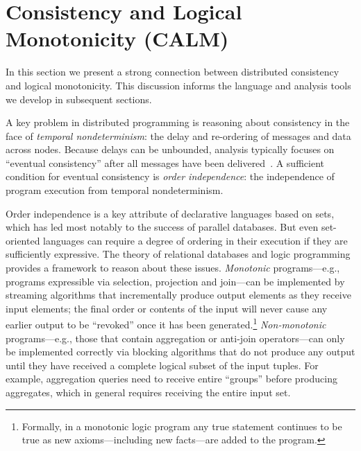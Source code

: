 \section{Consistency and Logical Monotonicity (CALM)}
In this section we present a strong connection between distributed consistency and logical monotonicity.  This discussion informs the language and analysis tools we develop in subsequent sections.

A key problem in distributed programming is reasoning about consistency in the face of {\em
temporal nondeterminism}: the delay and re-ordering of messages and data across
nodes.  Because delays can be unbounded, analysis typically focuses on ``eventual consistency'' after all messages have been delivered~\cite{vogels}.  A sufficient condition for eventual consistency is {\em order independence}: the independence of program execution from temporal
nondeterminism.

Order independence is a key attribute of declarative languages based on sets, which has led most notably to the success of parallel databases.  But even set-oriented languages can require a degree of ordering in their execution if they are sufficiently expressive.
The theory of relational databases and logic programming provides a framework to reason about these issues. \emph{Monotonic} programs---e.g., programs expressible via selection, projection and join---can be implemented by streaming algorithms that incrementally produce output elements as they receive input elements; the final order or contents of the input will never cause any earlier output to be ``revoked'' once it has been generated.\footnote{Formally, in a monotonic logic program any true statement continues to be true as new axioms---including new facts---are added to the program.}   
\emph{Non-monotonic} programs---e.g., those that contain aggregation or anti-join operators---can only be implemented correctly via blocking algorithms that do not produce any output until they have received a complete logical subset of the input tuples.  For example, aggregation queries need to receive entire ``groups'' before producing aggregates, which in general requires receiving the entire input set.

